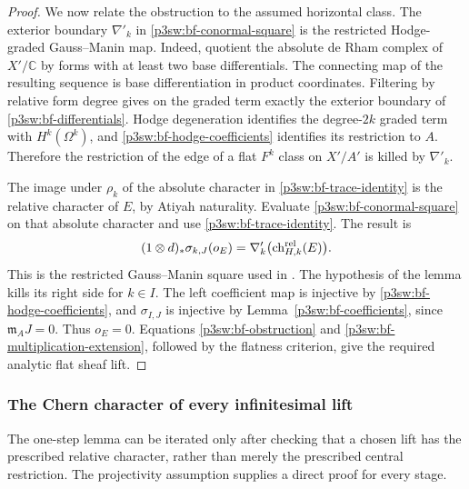 \documentclass[11pt]{article}
\newcommand{\C}{\mathbb C}
\numberwithin{equation}{section}
\begin{document}
\begin{proof}
We now relate the obstruction to the assumed horizontal class.
The exterior boundary \(\nabla'_k\) in
\eqref{p3sw:bf-conormal-square} is the restricted Hodge-graded
Gauss--Manin map.  Indeed, quotient the absolute de Rham
complex of \(X'/\C\) by forms with at least two base
differentials.  The connecting map of the resulting sequence
is base differentiation in product coordinates.  Filtering
by relative form degree gives on the graded term exactly the
exterior boundary of \eqref{p3sw:bf-differentials}.  Hodge
degeneration identifies the degree-\(2k\) graded term with
\(H^k(\Omega^k)\), and
\eqref{p3sw:bf-hodge-coefficients} identifies its restriction
to \(A\).  Therefore the restriction of the edge of a flat
\(F^k\) class on \(X'/A'\) is killed by \(\nabla'_k\).

The image under \(\rho_k\) of the absolute character in
\eqref{p3sw:bf-trace-identity} is the relative character of
\(E\), by Atiyah naturality.  Evaluate
\eqref{p3sw:bf-conormal-square} on that absolute character
and use \eqref{p3sw:bf-trace-identity}.  The result is
\begin{equation}
\label{p3sw:bf-semiregularity-square}
 (1\otimes d)_*\sigma_{k,J}(o_E)
       =\nabla'_k\bigl(\operatorname{ch}^{\rm rel}_{H,k}(E)\bigr).
\end{equation}
This is the restricted Gauss--Manin square used in
\cite[Lemma~5.8 and Proposition~5.9]{P3SWBuchweitzFlenner2003}.
The hypothesis of the lemma kills its right side for \(k\in I\).
The left coefficient map is injective by
\eqref{p3sw:bf-hodge-coefficients}, and
\(\sigma_{I,J}\) is injective by
Lemma~\ref{p3sw:bf-coefficients}, since \(\mathfrak m_AJ=0\).
Thus \(o_E=0\).  Equations
\eqref{p3sw:bf-obstruction} and
\eqref{p3sw:bf-multiplication-extension}, followed by the
flatness criterion, give the required analytic flat sheaf lift.
\end{proof}

\subsubsection{The Chern character of every infinitesimal lift}

The one-step lemma can be iterated only after checking that a chosen
lift has the prescribed relative character, rather than merely the
prescribed central restriction.  The projectivity assumption supplies
a direct proof for every stage.
\end{document}
